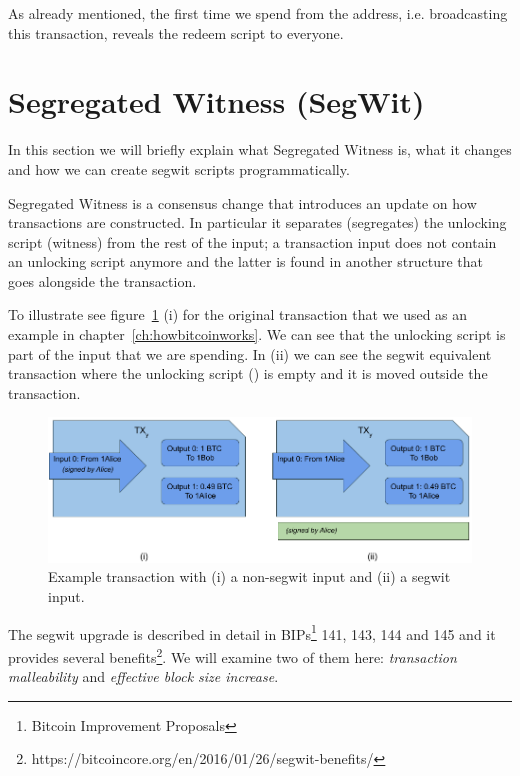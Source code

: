 \begin{note}
As already mentioned, the first time we spend from the address, i.e. broadcasting this transaction, reveals the redeem script to everyone.
\end{note}



\section{Segregated Witness (SegWit)}
\label{sec:segwit}

In this section we will briefly explain what Segregated Witness is, what it changes and how we can create segwit scripts programmatically. 

Segregated Witness is a consensus change that introduces an update on how transactions are constructed. In particular it separates (segregates) the unlocking script (witness) from the rest of the input; a transaction input does not contain an unlocking script anymore and the latter is found in another structure that goes alongside the transaction. 

To illustrate see figure~\ref{fig:tx-with-without-segwit} (i) for the original transaction that we used as an example in chapter~\ref{ch:howbitcoinworks}. We can see that the unlocking script is part of the input that we are spending. In (ii) we can see the segwit equivalent transaction where the unlocking script () is empty and it is moved outside the transaction.

\begin{figure}[H]
\begin{center}
\includegraphics[scale=0.5]{images/tx-with-without-segwit}
\caption{Example transaction with (i) a non-segwit input and (ii) a segwit input.}
\label{fig:tx-with-without-segwit}
\end{center}
\end{figure}

The segwit upgrade is described in detail in BIPs\footnote{Bitcoin Improvement Proposals} 141, 143, 144 and 145 and it provides several benefits\footnote{https://bitcoincore.org/en/2016/01/26/segwit-benefits/}. We will examine two of them here: \emph{transaction malleability} and \emph{effective block size increase}.

